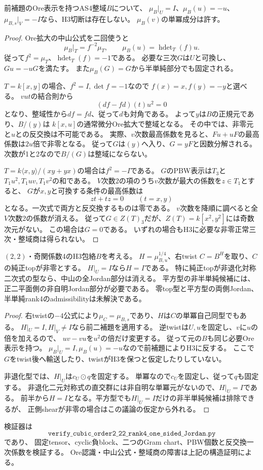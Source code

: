 \begin{lemma}
\label{lem:h3-order2-22-rank4-one-sided-Ore-empty}
前補題のOre表示を持つAS4整域$B$について、
$\mu_B|_U=I$、$\mu_B(u)=-u$、$\mu_{B,s}|_V=-I$なら、H3切断は存在しない。
$\mu_B(v)$の単冪成分は許す。
\end{lemma}
\begin{proof}
Ore拡大の中山公式を二回使うと
\[
 \mu_B|_T=f^{-2}\mu_T,\qquad
 \mu_B(u)=\operatorname{hdet}_T(f)u.
\]
従って$f^2=\mu_T$、$\operatorname{hdet}_T(f)=-1$である。
必要な三次$G$は$U$と可換し、$Gu=-uG$を満たす。
また$\mu_B(G)=G$から半単純部分でも固定される。

$T=k[x,y]$の場合、$f^2=I,\det f=-1$なので
$f(x)=x,f(y)=-y$と選べる。
$vut$の結合則から
\[
 (df-fd)(t)u^2=0
\]
となり、整域性から$df=fd$、従って$d$も対角である。
よって$y$は$B$の正規元であり、$B/(y)$は
$k[x,u]$の通常微分Ore拡大で整域となる。
その中では、非零元と$u$との反交換は不可能である。
実際、$v$次数最高係数を見ると、$Fu+uF$の最高係数は$2u$倍で非零となる。
従って$G$は$(y)$へ入り、$G=yF$と因数分解される。
次数が1と2なので$B/(G)$は整域にならない。

$T=k\langle x,y\rangle/(xy+yx)$の場合は$f^2=-I$である。
$G$のPBW表示は$T_3$と$T_1u^2,T_1uv,T_1v^2$の和である。
$V$次数2の項のうち$v$次数が最大の係数を$z\in T_1$とすると、
$G$が$x,y$と可換する条件の最高係数は
\[
 zt+tz=0\qquad(t=x,y)
\]
となる。一次式で両方と反交換するものは零である。
$v$次数を降順に調べると全$V$次数2の係数が消える。
従って$G\in Z(T)_3$だが、$Z(T)=k[x^2,y^2]$には奇数次元がない。
この場合は$G=0$である。
いずれの場合もH3に必要な非零正常三次・整域商は得られない。
\end{proof}

\begin{theorem}[非零正topにおける片側Jordanの消滅]
\label{thm:h3-order2-22-rank4-one-sided-Jordan}
$(2,2)$・奇関係数4のH3包絡$B$を考える。
$H=\mu_{B,u}^{1/4}$、右twist $C=B^H$を取り、$C$の純正topが非零とする。
$H|_U=I$なら$H=I$である。
特に純正topが非退化対称二次式の型なら、中山の全Jordan部分は消える。
平方型の非半単純候補には、正二平面側の非自明Jordan部分が必要である。
零top型と平方型の両側Jordan、半単純rank4のadmissibilityは未解決である。
\end{theorem}
\begin{proof}
右twistの$-4$公式により$\mu_C=\mu_{B,s}$であり、$H$は$C$の単冪自己同型でもある。
$H|_U=I,H|_V\ne I$なら前二補題を適用する。
逆twistは$U,u$を固定し、$v$に$u$の倍を加えるので、
$uv-vu$を$u^2$の倍だけ変更する。
従って元の$B$も同じ必要Ore表示を持つ。
$\mu_B|_U=I,\mu_B(u)=-u$なので前補題によりH3に反する。
ここで$G$をtwist後へ輸送したり、twistがH3を保つと仮定したりしていない。

非退化型では、$H|_U$は$c_U\mathbin{\odot}q$を固定する。
単冪なので$c_U$を固定し、従って$q$も固定する。
非退化二元対称式の直交群には非自明な単冪元がないので、$H|_U=I$である。
前半から$H=I$となる。平方型でも$H|_U=I$だけの非半単純候補は排除できるが、
正側shearが非零の場合はこの議論の仮定から外れる。
\end{proof}

検証器は
\[
 \texttt{verify\_cubic\_order2\_22\_rank4\_one\_sided\_Jordan.py}
\]
であり、
固定tensor、cyclic負block、二つのGram chart、PBW個数と反交換一次係数を検証する。
Ore認識・中山公式・整域商の障害は上記の構造証明による。
